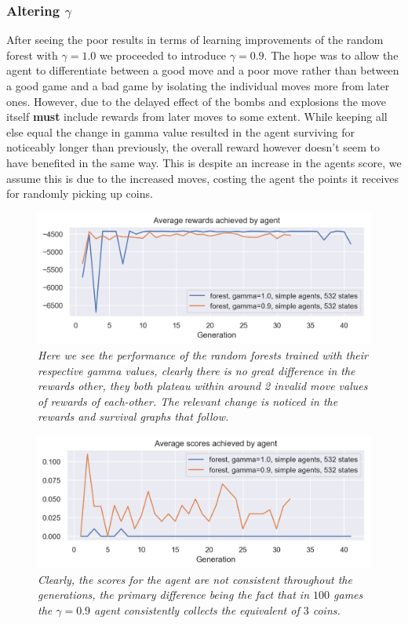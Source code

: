 \subsubsection{Altering $\gamma$}
After seeing the poor results in terms of learning improvements of the random forest with $\gamma = 1.0$ we proceeded to introduce $\gamma = 0.9$. The hope was to allow the agent to differentiate between a good move and a poor move rather than between a good game and a bad game by isolating the individual moves more from later ones. However, due to the delayed effect of the bombs and explosions the move itself \textbf{must} include rewards from later moves to some extent. While keeping all else equal the change in gamma value resulted in the agent surviving for noticeably longer than previously, the overall reward however doesn't seem to have benefited in the same way. This is despite an increase in the agents score, we assume this is due to the increased moves, costing the agent the points it receives for randomly picking up coins.
\begin{figure}[!h]
\centering
	\includegraphics[width=\linewidth]{images/forest09_vs_forest1rew.png}
	\caption{\textit{Here we see the performance of the random forests trained with their respective gamma values, clearly there is no great difference in the rewards other, they both plateau within around 2 invalid move values of rewards of each-other. The relevant change is noticed in the rewards and survival graphs that follow.}}
	\label{forest09_vs_forest1rew}
\end{figure}
\begin{figure}[!h]
\centering
	\includegraphics[width=\linewidth]{images/forest09_vs_forest1sco.png}
	\caption{\textit{Clearly, the scores for the agent are not consistent throughout the generations, the primary difference being the fact that in $100$ games the $\gamma = 0.9$ agent consistently collects the equivalent of $3$ coins.}}
	\label{forest09_vs_forest1sco}
\end{figure}
